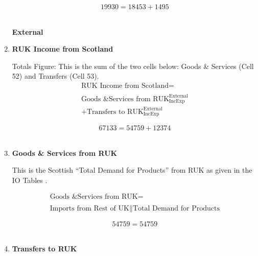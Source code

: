 \begin{enumerate}
\begin{equation} \nonumber
19930 = 18453+1495
\end{equation}\\



\newpage



\begin{center}
\textbf{\LARGE External}
\end{center}

\item \textbf {RUK Income from Scotland}

Totals Figure: This is the sum of the two cells below: Goods \& Services (Cell 52) and Transfers (Cell 53).\\

\begin{equation}
\begin{split}
\text{RUK Income from Scotland} =  \\ \\
\text{Goods \& Services from RUK}^\text{External}_\text{IncExp}\\
+\text{Transfers to RUK}^\text{External}_\text{IncExp}
\end{split} \label{eq:2.5.55}
\end{equation}

\begin{equation} \nonumber
67133 = 54759+12374
\end{equation}\\


\item \textbf {Goods \& Services from RUK}

This is the Scottish ``Total Demand for Products'' from RUK as given in the IO Tables \cite{ScotGov2013a}.

\begin{equation}
\begin{split}
\text{Goods \& Services from RUK} =  \\ \\
\text{Imports from Rest of UK}\|\text{Total Demand for Products}
\end{split} \label{eq:2.5.56}
\end{equation}

\begin{equation} \nonumber
54759 = 54759
\end{equation}\\


\item \textbf {Transfers to RUK}


\end{enumerate}
